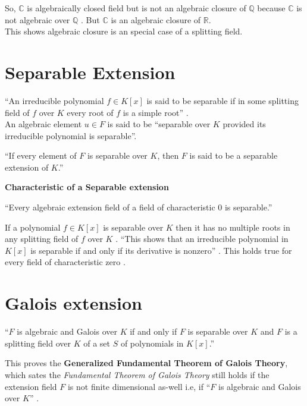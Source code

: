So, \(\mathbb{C}\) is algebraically closed field but is not an algebraic closure of \(\mathbb{Q}\) because \(\mathbb{C}\) is not algebraic over \(\mathbb{Q}\) \cite{hunger}.
But \(\mathbb{C}\) is an algebraic closure of \(\mathbb{R}\).\\
This shows algebraic closure is an special case of a splitting field.

\section{Separable Extension}
``An irreducible polynomial \(f \in K[x]\) is said to be separable if in some splitting field of \(f\) over \(K\) every root of \(f\) is a simple root'' \cite{hunger}.\\
An algebraic element \(u \in F\) is said to be ``separable over \(K\) provided its irreducible polynomial is separable''\cite{hunger}.
\begin{definition} \cite{hunger}
  ``If every element of \(F\) is separable over \(K\), then \(F\) is said to be a separable extension of \(K\).''
\end{definition}
\vspace{3mm}
\noindent
\textbf{Characteristic of a Separable extension}
\begin{remark} \cite{hunger}
  ``Every algebraic extension field of a field of characteristic \(0\) is separable.''
  \end{remark}
If a polynomial \(f \in K[x]\) is separable over \(K\) then it has no multiple roots in any splitting field of \(f\) over \(K\) \cite{hunger}. ``This shows that an irreducible polynomial in \(K[x]\) is separable if and only if its derivative is nonzero'' \cite{hunger}. This holds true for every field of characteristic zero \cite{hunger}.

\section{Galois extension}
\begin{theorem} \cite{hunger}
  ``\(F\) is algebraic and Galois over \(K\) if and only if \(F\) is separable over \(K\) and \(F\) is a splitting field over \(K\) of a set \(S\) of polynomials in \(K[x]\).''
  \end{theorem}

This proves the \textbf{Generalized Fundamental Theorem of Galois Theory},\\
which sates the \textit{Fundamental Theorem of Galois Theory} still holds if the extension field \(F\) is not finite dimensional as-well i.e, if ``\(F\) is algebraic and Galois over \(K\)'' \cite{hunger}.
